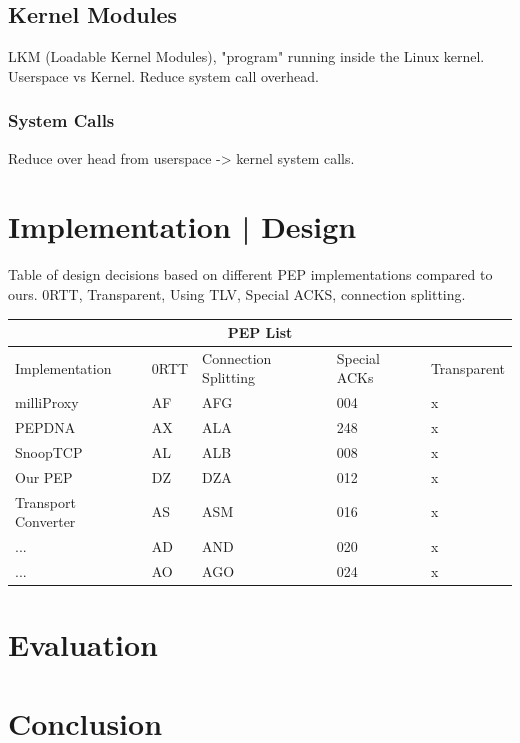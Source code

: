 \documentclass[a4paper,english, 11pt]{report}
\begin{document}
\section{Kernel Modules}
LKM (Loadable Kernel Modules), "program" running inside the Linux kernel.
Userspace vs Kernel. Reduce system call overhead.
\subsection{System Calls}
Reduce over head from userspace -> kernel system calls.

\chapter{Implementation | Design}

{Table of design decisions based on different PEP implementations compared to ours.}
{0RTT, Transparent, Using TLV, Special ACKS, connection splitting.}\\
\begin{tabular}{ |p{4cm}||p{2cm}|p{2cm}|p{2cm}|p{2cm}| }
 \hline
 \multicolumn{5}{|c|}{PEP List} \\
 \hline
 Implementation& 0RTT &Connection Splitting &Special ACKs &Transparent\\
 \hline
 milliProxy   & AF    &AFG&   004 & x\\
 PEPDNA&   AX  & ALA   &248 & x\\
 SnoopTCP &AL & ALB&  008 & x\\
 Our PEP    &DZ & DZA&  012& x \\
 Transport Converter &   AS  & ASM&016& x\\
 ...& AD  & AND   &020& x\\
 ...& AO  & AGO&024& x\\
 \hline
\end{tabular}

\chapter{Evaluation}
\chapter{Conclusion}

{}

\end{document}
